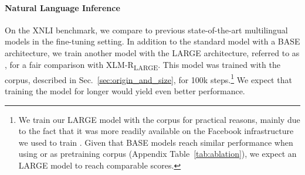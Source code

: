 \paragraph{Natural Language Inference}
On the XNLI benchmark, we compare \camembert to previous state-of-the-art multilingual models in the fine-tuning setting. In addition to the standard \camembert model with a BASE architecture, we train another model with the LARGE architecture, referred to as \camembertccnetlarge, for a fair comparison with XLM-R\textsubscript{LARGE}. This model was trained with the \ccnet corpus, described in Sec.~\ref{sec:origin_and_size}, for 100k steps.\footnote{We train our LARGE model with the \ccnet corpus for practical reasons, mainly due to the fact that it was more readily available on the Facebook infrastructure we used to train \camembert. Given that BASE models reach similar performance when using \oscar or \ccnet as pretraining corpus (Appendix Table~\ref{tab:ablation}), we expect an \oscar LARGE model to reach comparable scores.} We expect that training the model for longer would yield even better performance.

\begin{table}[ht]
    \centering\small
    \caption{\textbf{NLI} accuracy on the French XNLI test set (best model selected on validation out of 10). Best scores in bold, second best underlined.\label{table:xnli}}
\end{table}

